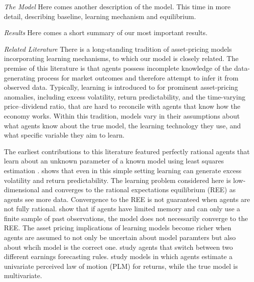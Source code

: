 \documentclass[11pt]{article}
\begin{document}
\textit{The Model} Here comes another description of the model. This time in more detail, describing baseline, learning mechanism and equilibrium.

\textit{Results} Here comes a short summary of our most important results.

\textit{Related Literature} 
There is a long-standing tradition of asset-pricing models incorporating learning mechanisms, to which our model is closely related. 
The premise of this literature is that agents possess incomplete knowledge of the data-generating process for market outcomes and therefore attempt to infer it from observed data.
Typically, learning is introduced to for prominent asset-pricing anomalies, including excess volatility, return predictability, and the time-varying price–dividend ratio, that are hard to reconcile with agents that know how the economy works.
Within this tradition, models vary in their assumptions about what agents know about the true model, the learning technology they use, and what specific variable they aim to learn.

The earliest contributions to this literature featured perfectly rational agents that learn about an unknown parameter of a known model using least squares estimation \citep{Marcet1989}.
\cite{Timmermann1993,Timmermann1996} shows that even in this simple setting learning can generate excess volatility and return predictability.
The learning problem considered here is low-dimensional and converges to the rational expectations equilibrium (REE) as agents see more data.
Convergence to the REE is not guaranteed when agents are not fully rational.
\cite{Honkapohja2003} show that if agents have limited memory and can only use a finite sample of past observations, the model does not necessarily converge to the REE.
The asset pricing implications of learning models become richer when agents are assumed to not only be uncertain about model paramters but also about whcih model is the correct one.
\cite{barberis1998model} study agents that switch between two different earnings forecasting rules.
\cite{hong2007simple,Branch2010} study models in which agents estimate a univariate perceived law of motion (PLM) for returns, while the true model is multivariate. 
\end{document}
